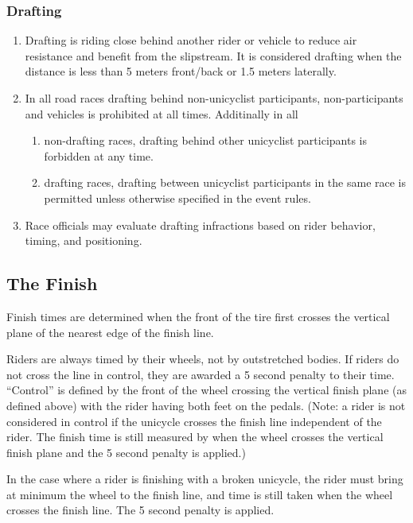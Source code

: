 \subsubsection{Drafting}
	\begin{enumerate}[leftmargin=1.5em,labelsep=*]
		\item Drafting is riding close behind another rider or vehicle to reduce air resistance and benefit from the slipstream.
		It is considered drafting when the distance is less than 5 meters front/back or 1.5 meters laterally.
		\item In all road races drafting behind non-unicyclist participants, non-participants and vehicles is prohibited at all times.
		Additinally in all
		\begin{enumerate}[label*=\arabic*,leftmargin=1.5em,labelsep=*]
			\item non-drafting races, drafting behind other unicyclist participants is forbidden at any time.
			\item drafting races, drafting between unicyclist participants in the same race is permitted unless otherwise specified in the event rules.
		\end{enumerate}
		\item Race officials may evaluate drafting infractions based on rider behavior, timing, and positioning.
	\end{enumerate}

\subsection{The Finish}

Finish times are determined when the front of the tire first crosses the vertical plane of the nearest edge of the finish line.

Riders are always timed by their wheels, not by outstretched bodies.
If riders do not cross the line in control, they are awarded a 5 second penalty to their time.
``Control'' is defined by the front of the wheel crossing the vertical finish plane (as defined above) with the rider having both feet on the pedals.
(Note: a rider is not considered in control if the unicycle crosses the finish line independent of the rider.
The finish time is still measured by when the wheel crosses the vertical finish plane and the 5 second penalty is applied.)

In the case where a rider is finishing with a broken unicycle, the rider must bring at minimum the wheel to the finish line, and time is still taken when the wheel crosses the finish line.
The 5 second penalty is applied.
